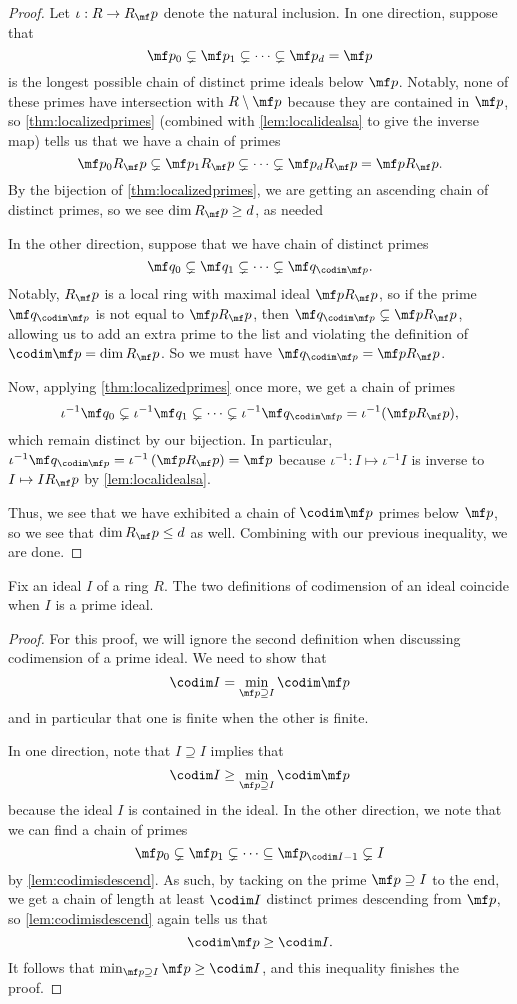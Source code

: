 \begin{proof}
	Let $\iota:R\to R_\mf p$ denote the natural inclusion. In one direction, suppose that
	\[\mf p_0\subsetneq\mf p_1\subsetneq\cdots\subsetneq\mf p_d=\mf p\]
	is the longest possible chain of distinct prime ideals below $\mf p$. Notably, none of these primes have intersection with $R\setminus\mf p$ because they are contained in $\mf p$, so \autoref{thm:localizedprimes} (combined with \autoref{lem:localidealsa} to give the inverse map) tells us that we have a chain of primes
	\[\mf p_0R_\mf p\subsetneq\mf p_1R_\mf p\subsetneq\cdots\subsetneq\mf p_dR_\mf p=\mf pR_\mf p.\]
	By the bijection of \autoref{thm:localizedprimes}, we are getting an ascending chain of distinct primes, so we see $\dim R_\mf p\ge d$, as needed

	In the other direction, suppose that we have chain of distinct primes
	\[\mf q_0\subsetneq\mf q_1\subsetneq\cdots\subsetneq\mf q_{\codim\mf p}.\]
	Notably, $R_\mf p$ is a local ring with maximal ideal $\mf pR_\mf p$, so  if the prime $\mf q_{\codim\mf p}$ is not equal to $\mf pR_\mf p$, then $\mf q_{\codim\mf p}\subsetneq\mf pR_\mf p$, allowing us to add an extra prime to the list and violating the definition of $\codim\mf p=\dim R_\mf p$. So we must have $\mf q_{\codim\mf p}=\mf pR_\mf p$.

	Now, applying \autoref{thm:localizedprimes} once more, we get a chain of primes
	\[\iota^{-1}\mf q_0\subsetneq\iota^{-1}\mf q_1\subsetneq\cdots\subsetneq\iota^{-1}\mf q_{\codim\mf p}=\iota^{-1}(\mf pR_\mf p),\]
	which remain distinct by our bijection. In particular, $\iota^{-1}\mf q_{\codim\mf p}=\iota^{-1}\left(\mf pR_\mf p\right)=\mf p$ because $\iota^{-1}:I\mapsto\iota^{-1}I$ is inverse to $I\mapsto IR_\mf p$ by \autoref{lem:localidealsa}.

	Thus, we see that we have exhibited a chain of $\codim\mf p$ primes below $\mf p$, so we see that $\dim R_\mf p\le d$ as well. Combining with our previous inequality, we are done.
\end{proof}
\begin{lemma}
	Fix an ideal $I$ of a ring $R$. The two definitions of codimension of an ideal coincide when $I$ is a prime ideal.
\end{lemma}
\begin{proof}
	For this proof, we will ignore the second definition when discussing codimension of a prime ideal. We need to show that
	\[\codim I=\min_{\mf p\supseteq I}\codim\mf p\]
	and in particular that one is finite when the other is finite.

	In one direction, note that $I\supseteq I$ implies that
	\[\codim I\ge\min_{\mf p\supseteq I}\codim\mf p\]
	because the ideal $I$ is contained in the ideal. In the other direction, we note that we can find a chain of primes
	\[\mf p_0\subsetneq\mf p_1\subsetneq\cdots\subseteq\mf p_{\codim I-1}\subsetneq I\]
	by \autoref{lem:codimisdescend}. As such, by tacking on the prime $\mf p\supseteq I$ to the end, we get a chain of length at least $\codim I$ distinct primes descending from $\mf p$, so \autoref{lem:codimisdescend} again tells us that
	\[\codim\mf p\ge\codim I.\]
	It follows that $\min_{\mf p\supseteq I}\mf p\ge\codim I$, and this inequality finishes the proof.
\end{proof}

